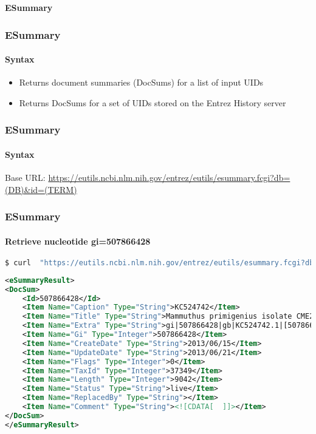 \documentclass{beamer}
\newcommand{\centeredtitle}[1]{
\begin{center}
    \Huge{\bf{#1}}
\end{center}
}
\newcommand{\hugeslide}[1]{
\begin{frame}
\centeredtitle{#1}
\end{frame}
}
\begin{document}

\hugeslide{ESummary}

\begin{frame}[fragile]
\frametitle{ESummary}
\framesubtitle{Syntax}
\begin{itemize}
\item Returns document summaries (DocSums) for a list of input UIDs
\item Returns DocSums for a set of UIDs stored on the Entrez History server
\end{itemize}
\end{frame}

\begin{frame}[fragile]
\frametitle{ESummary}
\framesubtitle{Syntax}
Base URL:
\url{https://eutils.ncbi.nlm.nih.gov/entrez/eutils/esummary.fcgi?db=(DB)\&id=(TERM)}
\end{frame}


\begin{frame}[fragile]
\frametitle{ESummary}
\framesubtitle{Retrieve nucleotide gi=507866428}
\begin{lstlisting}[language=bash,basicstyle=\tiny,breaklines=true]
$ curl  "https://eutils.ncbi.nlm.nih.gov/entrez/eutils/esummary.fcgi?db=nucleotide&id=507866428"
\end{lstlisting}

\begin{lstlisting}[language=xml,basicstyle=\tiny,breaklines=false]
<eSummaryResult>
<DocSum>
	<Id>507866428</Id>
	<Item Name="Caption" Type="String">KC524742</Item>
	<Item Name="Title" Type="String">Mammuthus primigenius isolate CME2005/915 myoglobin (Mb) gene, partial cds</Item>
	<Item Name="Extra" Type="String">gi|507866428|gb|KC524742.1|[507866428]</Item>
	<Item Name="Gi" Type="Integer">507866428</Item>
	<Item Name="CreateDate" Type="String">2013/06/15</Item>
	<Item Name="UpdateDate" Type="String">2013/06/21</Item>
	<Item Name="Flags" Type="Integer">0</Item>
	<Item Name="TaxId" Type="Integer">37349</Item>
	<Item Name="Length" Type="Integer">9042</Item>
	<Item Name="Status" Type="String">live</Item>
	<Item Name="ReplacedBy" Type="String"></Item>
	<Item Name="Comment" Type="String"><![CDATA[  ]]></Item>
</DocSum>
</eSummaryResult>
\end{lstlisting}
\end{frame}
\end{document}

